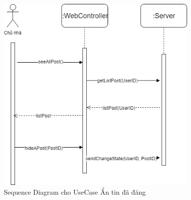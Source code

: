 \begin{figure}[!h]
	\centering
	\includegraphics[width=10cm]{parts/bao/images/SequenceDiagram_HidePost.png}
	\caption{Sequence Diagram cho UseCase Ẩn tin đã đăng}
\end{figure}
